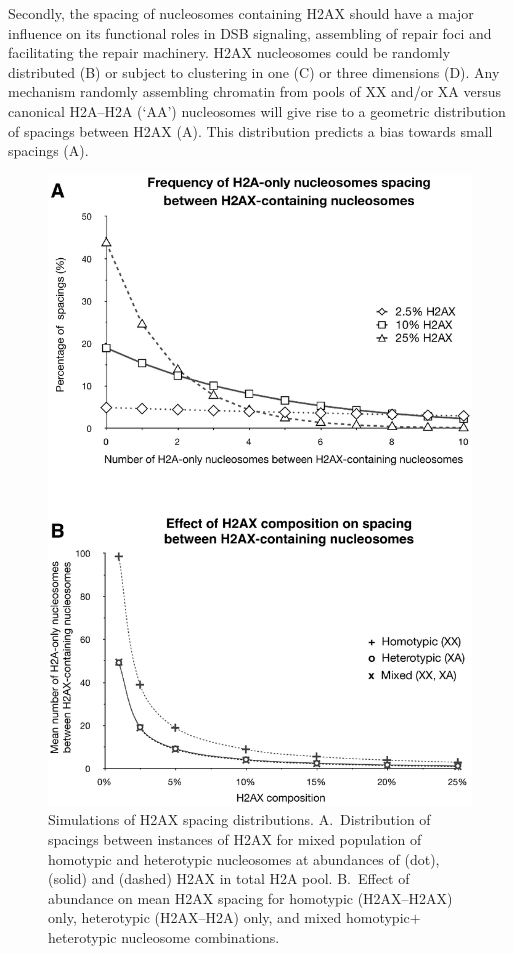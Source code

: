 Secondly, the spacing of nucleosomes containing H2AX should have a
major influence on its functional roles in DSB signaling, assembling
of repair foci and facilitating the repair machinery. H2AX nucleosomes
could be randomly distributed
(B) or subject to clustering
in one (C) or three dimensions
(D). Any mechanism randomly
assembling chromatin from pools of XX and/or XA versus canonical
H2A--H2A (`AA') nucleosomes will give rise to a geometric distribution
of spacings between H2AX (A).
This distribution predicts a bias towards small spacings
(A).

\begin{figure}
\includegraphics[width=\textwidth]{h2ax-review/figs/Fig7}
\caption[Simulations of H2AX spacing distributions]%
        {Simulations of H2AX spacing distributions.
          A.~Distribution of spacings between instances of H2AX for
          mixed population of homotypic and heterotypic nucleosomes at
          abundances of  (dot),  (solid) and
           (dashed) H2AX in total H2A pool.
          B.~Effect of abundance on mean H2AX spacing for homotypic
          (H2AX--H2AX) only, heterotypic (H2AX--H2A) only, and mixed
          homotypic$+$heterotypic nucleosome combinations.}
\label{fig:h2ax-review:H2AX-graphs}
\end{figure}

